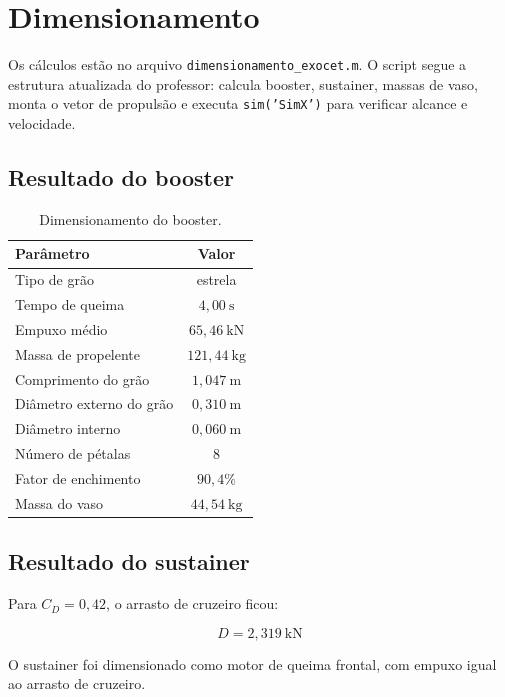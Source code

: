﻿\section{Dimensionamento}

Os cálculos estão no arquivo \texttt{dimensionamento\_exocet.m}. O script segue a estrutura atualizada do professor: calcula booster, sustainer, massas de vaso, monta o vetor de propulsão e executa \texttt{sim('SimX')} para verificar alcance e velocidade.

\subsection{Resultado do booster}

\begin{table}[H]
\centering
\caption{Dimensionamento do booster.}
\begin{tabular}{lc}
\toprule
Parâmetro & Valor \\
\midrule
Tipo de grão & estrela \\
Tempo de queima & \(4{,}00~\text{s}\) \\
Empuxo médio & \(65{,}46~\text{kN}\) \\
Massa de propelente & \(121{,}44~\text{kg}\) \\
Comprimento do grão & \(1{,}047~\text{m}\) \\
Diâmetro externo do grão & \(0{,}310~\text{m}\) \\
Diâmetro interno & \(0{,}060~\text{m}\) \\
Número de pétalas & 8 \\
Fator de enchimento & \(90{,}4\%\) \\
Massa do vaso & \(44{,}54~\text{kg}\) \\
\bottomrule
\end{tabular}
\end{table}

\subsection{Resultado do sustainer}

Para \(C_D=0{,}42\), o arrasto de cruzeiro ficou:

\begin{equation}
    D = 2{,}319~\text{kN}
\end{equation}

O sustainer foi dimensionado como motor de queima frontal, com empuxo igual ao arrasto de cruzeiro.

